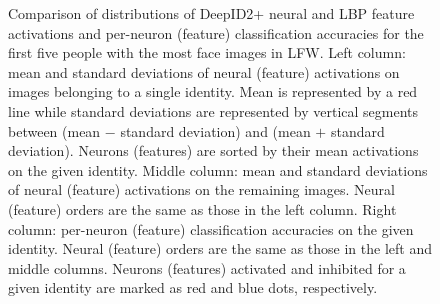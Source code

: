 \documentclass[10pt,twocolumn,letterpaper]{article}
\begin{document}
\begin{figure}[tb!]
\vspace{-0.05in}
\caption{Comparison of distributions of DeepID2+ neural and LBP feature activations and per-neuron (feature) classification accuracies for the first five people with the most face images in LFW. Left column: mean and standard deviations of neural (feature) activations on images belonging to a single identity. Mean is represented by a red line while standard deviations are represented by vertical segments between (mean $-$ standard deviation) and (mean $+$ standard deviation). Neurons (features) are sorted by their mean activations on the given identity. Middle column: mean and standard deviations of neural (feature) activations on the remaining images. Neural (feature) orders are the same as those in the left column. Right column: per-neuron (feature) classification accuracies on the given identity. Neural (feature) orders are the same as those in the left and middle columns. Neurons (features) activated and inhibited for a given identity are marked as red and blue dots, respectively.}
\vspace{-0.05in}
\label{fig:act}
\end{figure}
\end{document}
